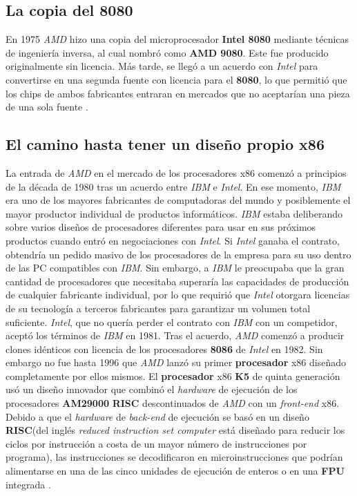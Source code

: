\subsection{La copia del 8080}
En 1975  \emph{AMD} hizo una copia del microprocesador \textbf{Intel 8080} mediante técnicas de ingeniería inversa, al cual nombró como \textbf{AMD 9080}.
Este fue producido originalmente sin licencia. Más tarde, se llegó a un acuerdo con \emph{Intel} para convertirse en una segunda fuente con licencia 
para el \textbf{8080}, lo que permitió que los chips de ambos fabricantes entraran en mercados que no aceptarían una pieza de una sola fuente 
.

\subsection{El camino hasta tener un diseño propio x86}
La entrada de \emph{AMD} en el mercado de los procesadores x86 comenzó a principios de la década de 1980 tras un acuerdo entre \emph{IBM} e \emph{Intel}. En ese momento, \emph{IBM}
era uno de los mayores fabricantes de computadoras del mundo y posiblemente el mayor productor individual de productos informáticos. \emph{IBM} estaba deliberando sobre varios diseños
de procesadores diferentes para usar en sus próximos productos cuando entró en negociaciones con \emph{Intel}. Si \emph{Intel} ganaba el contrato, obtendría un pedido masivo de los
procesadores de la empresa para su uso dentro de las PC compatibles con \emph{IBM}. Sin embargo, a \emph{IBM} le preocupaba que la gran cantidad de procesadores que necesitaba
superaría las capacidades de producción de cualquier fabricante individual, por lo que requirió que \emph{Intel} otorgara licencias de su tecnología a terceros fabricantes
para garantizar un volumen total suficiente. \emph{Intel}, que no quería perder el contrato con \emph{IBM} con un competidor, aceptó los términos de \emph{IBM} en 1981. Tras el acuerdo,
\emph{AMD} comenzó a producir clones idénticos con licencia de los procesadores \textbf{8086} de \emph{Intel} en 1982. Sin embargo no fue hasta 1996 que \emph{AMD} lanzó su primer
\textbf{procesador} x86 diseñado completamente por ellos mismos. El \textbf{procesador} x86 \textbf{K5} de quinta generación usó un diseño innovador que combinó el \emph{hardware} de
ejecución de los procesadores \textbf{AM29000} \textbf{RISC} descontinuados de \emph{AMD} con un \emph{front-end} x86. Debido a que el \emph{hardware} de \emph{back-end} de ejecución
se basó en un diseño \textbf {RISC}(del inglés \emph{reduced instruction set computer} está diseñado para reducir los ciclos por instrucción a costa 	 
de un mayor número de instrucciones por programa), las instrucciones se decodificaron en microinstrucciones que podrían alimentarse en una de las cinco unidades de ejecución de enteros o en una
\textbf{FPU} integrada .


